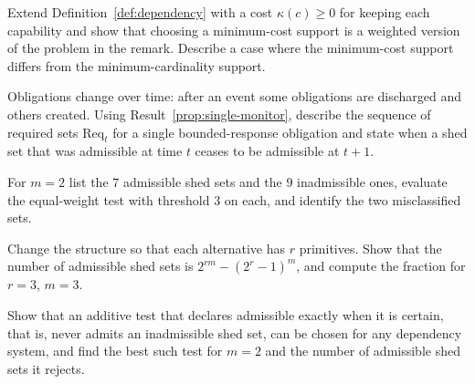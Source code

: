 \begin{exercise}
Extend Definition~\ref{def:dependency} with a cost $\kappa(c)\ge0$ for keeping each capability and show that choosing a minimum-cost support is a weighted version of the problem in the remark. Describe a case where the minimum-cost support differs from the minimum-cardinality support.
\end{exercise}

\begin{exercise}
Obligations change over time: after an event some obligations are discharged and others created. Using Result~\ref{prop:single-monitor}, describe the sequence of required sets $\mathrm{Req}_t$ for a single bounded-response obligation and state when a shed set that was admissible at time $t$ ceases to be admissible at $t+1$.
\end{exercise}


\begin{exercise}
For $m=2$ list the $7$ admissible shed sets and the $9$ inadmissible ones, evaluate the equal-weight test with threshold $3$ on each, and identify the two misclassified sets.\label{ex:seven-sets}
\end{exercise}

\begin{exercise}
Change the structure so that each alternative has $r$ primitives. Show that the number of admissible shed sets is $2^{rm}-(2^{r}-1)^{m}$, and compute the fraction for $r=3$, $m=3$.\label{ex:r-prims}
\end{exercise}

\begin{exercise}
Show that an additive test that declares admissible exactly when it is certain, that is, never admits an inadmissible shed set, can be chosen for any dependency system, and find the best such test for $m=2$ and the number of admissible shed sets it rejects.\label{ex:sound-test}
\end{exercise}

